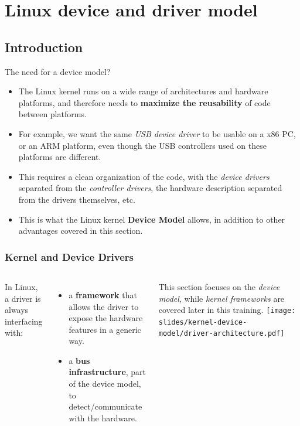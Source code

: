 \section{Linux device and driver model}

\subsection{Introduction}

\begin{frame}{The need for a device model?}
  \begin{itemize}
  \item The Linux kernel runs on a wide range of architectures and
    hardware platforms, and therefore needs to {\bf maximize the
      reusability} of code between platforms.
  \item For example, we want the same {\em USB device driver} to be
    usable on a x86 PC, or an ARM platform, even though the USB
    controllers used on these platforms are different.
  \item This requires a clean organization of the code, with the {\em
      device drivers} separated from the {\em controller drivers}, the
    hardware description separated from the drivers themselves, etc.
  \item This is what the Linux kernel {\bf Device Model} allows, in
    addition to other advantages covered in this section.
  \end{itemize}
\end{frame}

\begin{frame}
  \frametitle{Kernel and Device Drivers}
  \begin{columns}
     In Linux, a driver is always interfacing
    with:
    \begin{itemize}
    \item a {\bf framework} that allows the driver to expose the
      hardware features in a generic way.
    \item a {\bf bus infrastructure}, part of the device model, to
      detect/communicate with the hardware.
    \end{itemize}
    This section focuses on the {\em device model}, while {\em kernel
      frameworks} are covered later in this training.
    \texttt{[image: slides/kernel-device-model/driver-architecture.pdf]}
  \end{columns}
\end{frame}

